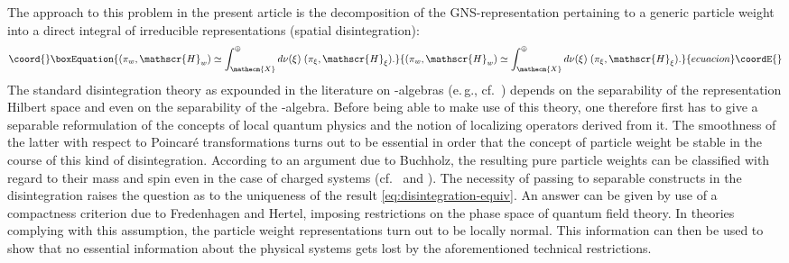 \documentclass[a4paper,a4paper]{article}
\numberwithin{equation}{section}
\providecommand{\Xecm}{\mathecm{X}}
\providecommand{\Hscr}{\mathscr{H}}
\theoremstyle{definition}
\theoremstyle{plain}
\theoremstyle{remark}
\theoremstyle{assumption}
\begin{document}
  The approach to this problem in the present article is the
  decomposition of the GNS-representation pertaining to a generic
  particle weight into a direct integral of irreducible
  representations (spatial disintegration):
  \begin{equation}\coord{}\boxEquation{
    \label{eq:disintegration-equiv}
    ( \pi_w , \Hscr_w ) \simeq \int_\Xecm^\oplus d \nu ( \xi ) \; (
    \pi_\xi , \Hscr_\xi ) \text{.}
  }{
    ( \pi_w , \Hscr_w ) \simeq \int_\Xecm^\oplus d \nu ( \xi ) \; (
    \pi_\xi , \Hscr_\xi ) \text{.}
  }{ecuacion}\coordE{}\end{equation}
  The standard disintegration theory as expounded in the literature on
  \coordHE{}-algebras (e.\,g., cf.~\cite{dixmier:1982}) depends on the
  separability of the representation Hilbert space and even on the
  separability of the \coordHE{}-algebra. Before being able to make use of
  this theory, one therefore first has to give a separable
  reformulation of the concepts of local quantum physics and the
  notion of localizing operators derived from it. The smoothness of
  the latter with respect to Poincar\'e transformations turns out to
  be essential in order that the concept of particle weight be stable
  in the course of this kind of disintegration. According to an
  argument due to Buchholz, the resulting pure particle weights can be
  classified with regard to their mass and spin even in the case of
  charged systems (cf.~\cite{buchholz/porrmann/stein:1991} and
  \cite[Section~VI.2.2]{haag:1996}). The necessity of passing to
  separable constructs in the disintegration raises the question as to
  the uniqueness of the result \eqref{eq:disintegration-equiv}. An
  answer can be given by use of a compactness criterion due to
  Fredenhagen and Hertel, imposing restrictions on the phase space of
  quantum field theory. In theories complying with this assumption,
  the particle weight representations turn out to be locally normal.
  This information can then be used to show that no essential
  information about the physical systems gets lost by the
  aforementioned technical restrictions.
  
\end{document}
